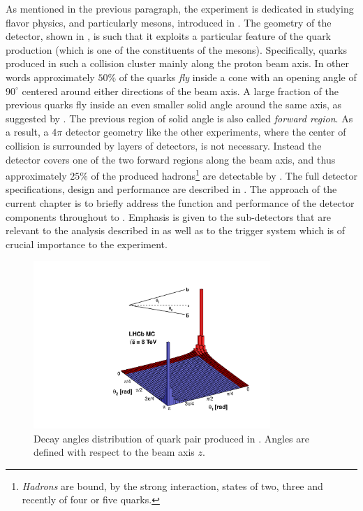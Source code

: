 As mentioned in the previous paragraph, the \lhcb experiment is dedicated in studying flavor physics,
and particularly \B mesons, introduced in . The geometry of the \lhcb detector,
shown in , is such that it exploits a particular feature of the
\bquark quark production (which is one of the constituents of the \B mesons). Specifically, \bquark quarks
produced in such a collision cluster mainly along the proton beam axis. In other words approximately $50\%$
of the \bquark quarks {\it fly} inside a cone with an opening angle of $90^\circ$ centered around
either directions of the beam axis. A large fraction of the previous quarks fly inside an even smaller
solid angle around the same axis, as suggested by . The previous region of solid
angle is also called {\it forward region}.
As a result, a $4\pi$ detector geometry like the other \lhc experiments, where the center of collision
is surrounded by layers of detectors, is not necessary. Instead the \lhcb detector covers one of the two
forward regions along the beam axis, and thus approximately $25\%$ of the produced \bquark
hadrons\footnote{ {\it Hadrons} are bound, by the strong interaction, states of two,
three and recently \cite{Aaij:2016nsc} of four or five quarks.} are detectable by \lhcb.
The full \lhcb detector specifications, design and performance are described in \cite{Aaij:2014jba}.
The approach of the current chapter is to briefly address the function and performance of the detector components
throughout  to . Emphasis is given to the sub-detectors that are relevant
to the analysis described in  as well as to the trigger system which is of crucial importance
to the \lhcb experiment.

\begin{figure}[t]
  \centering
  \includegraphics[width=0.8\textwidth, trim=0cm 0cm 0cm 2.5cm, clip=true]{Figures/Chapter2/08_rad_acc_scheme_right}
  \caption{Decay angles distribution of \bquark quark pair produced in \lhcb. Angles are defined with
           respect to the beam axis $z$.}
  \label{bb_roduction_angles}
\end{figure}
